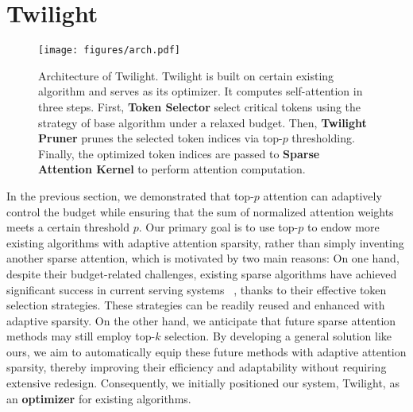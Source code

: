 \section{Twilight}
\begin{figure*}[t]
\begin{center}
\centerline{\texttt{[image: figures/arch.pdf]}}
\caption{Architecture of Twilight. Twilight is built on certain existing algorithm and serves as its optimizer. It computes self-attention in three steps. First, \textbf{Token Selector} select critical tokens using the strategy of base algorithm under a relaxed budget. Then, \textbf{Twilight Pruner} prunes the selected token indices via top-$p$ thresholding. Finally, the optimized token indices are passed to \textbf{Sparse Attention Kernel} to perform attention computation.}
\label{fig:arch}
\end{center}
\end{figure*}

In the previous section, we demonstrated that top-$p$ attention can adaptively control the budget while ensuring that the sum of normalized attention weights meets a certain threshold $p$. Our primary goal is to use top-$p$ to endow more existing algorithms with adaptive attention sparsity, rather than simply inventing another sparse attention, which is motivated by two main reasons: On one hand, despite their budget-related challenges, existing sparse algorithms have achieved significant success in current serving systems ~\cite{vllm, sglang}, thanks to their effective token selection strategies. These strategies can be readily reused and enhanced with adaptive sparsity.
On the other hand, we anticipate that future sparse attention methods may still employ top-$k$ selection. By developing a general solution like ours, we aim to automatically equip these future methods with adaptive attention sparsity, thereby improving their efficiency and adaptability without requiring extensive redesign. Consequently, we initially positioned our system, Twilight, as an \textbf{optimizer} for existing algorithms.

